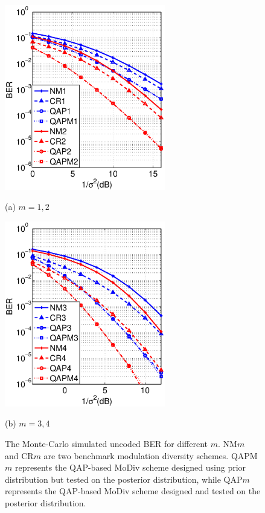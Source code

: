 \documentclass[journal,draftcls,onecolumn,12pt,twoside]{IEEEtran}
\begin{document}
\begin{figure}[htb]
  \begin{minipage}[b]{.48\linewidth}
    \centering
    \centerline{\includegraphics[width=7cm]{./figs/BER_noise_power_mismatch_montecarlo_64QAM_23.eps}}
    \centerline{(a) $m=1,2$}\medskip
  \end{minipage}
  \hfill
  \begin{minipage}[b]{0.48\linewidth}
    \centering
    \centerline{\includegraphics[width=7cm]{./figs/BER_noise_power_mismatch_montecarlo_64QAM_45.eps}}
    \centerline{(b) $m=3,4$}\medskip
  \end{minipage}
  \caption{The Monte-Carlo simulated uncoded BER for different $m$. NM$m$ and
  CR$m$ are two benchmark modulation diversity schemes. QAPM$m$ represents the
  QAP-based MoDiv scheme designed using prior distribution but tested on the
  posterior distribution, while QAP$m$ represents the QAP-based MoDiv scheme
  designed and tested on the posterior distribution.}
  \label{fig:mismatch}
\end{figure}
\end{document}
